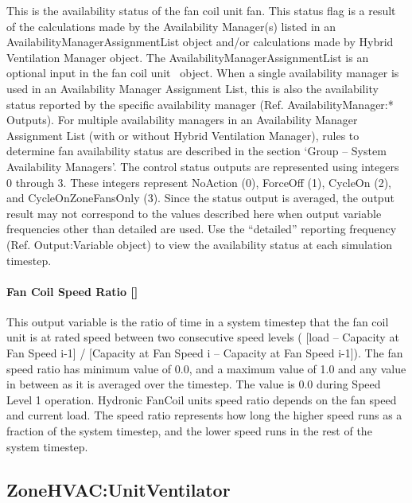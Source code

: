 This is the availability status of the fan coil unit fan. This status flag is a result of the calculations made by the Availability Manager(s) listed in an AvailabilityManagerAssignmentList object and/or calculations made by Hybrid Ventilation Manager object. The AvailabilityManagerAssignmentList is an optional input in the fan coil unit~ object. When a single availability manager is used in an Availability Manager Assignment List, this is also the availability status reported by the specific availability manager (Ref. AvailabilityManager:* Outputs). For multiple availability managers in an Availability Manager Assignment List (with or without Hybrid Ventilation Manager), rules to determine fan availability status are described in the section `Group -- System Availability Managers'. The control status outputs are represented using integers 0 through 3. These integers represent NoAction (0), ForceOff (1), CycleOn (2), and CycleOnZoneFansOnly (3). Since the status output is averaged, the output result may not correspond to the values described here when output variable frequencies other than detailed are used. Use the ``detailed'' reporting frequency (Ref. Output:Variable object) to view the availability status at each simulation timestep.

\paragraph{Fan Coil Speed Ratio {[]}}\label{fan-coil-speed-ratio}

This output variable is the ratio of time in a system timestep that the fan coil unit is at rated speed between two consecutive speed levels ( {[}load -- Capacity at Fan Speed i-1{]} / {[}Capacity at Fan Speed i -- Capacity at Fan Speed i-1{]}). The fan speed ratio has minimum value of 0.0, and a maximum value of 1.0 and any value in between as it is averaged over the timestep. The value is 0.0 during Speed Level 1 operation. Hydronic FanCoil units speed ratio depends on the fan speed and current load. The speed ratio represents how long the higher speed runs as a fraction of the system timestep, and the lower speed runs in the rest of the system timestep.

\subsection{ZoneHVAC:UnitVentilator}\label{zonehvacunitventilator}

